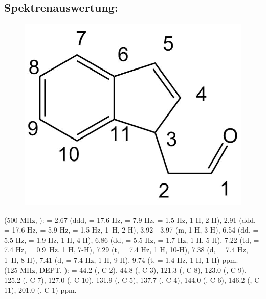 \documentclass[12pt]{article}
\begin{document}
\begin{onehalfspace}
\section{Spektrenauswertung:}
\begin{figure}[!htbp]
   \centering
\includegraphics[scale=0.3]{auswert.png}
\end{figure}
\noindent
\textbf{} (500 MHz, ): \sffamily \ce{$\delta$} =
2.67 (ddd,  = 17.6 \si{\hertz},  = 7.9 \si{\hertz},  = 1.5 \si{\hertz}, 1 H, 2-H),
2.91 (ddd,  = 17.6 \si{\hertz},  = 5.9 \si{\hertz},  = 1.5 \si{\hertz}, 1~H, 2-H), 
3.92 - 3.97 (m, 1 H, 3-H),
6.54 (dd,  = 5.5 \si{\hertz},  = 1.9 \si{\hertz}, 1 H, 4-H), 
6.86 (dd,  = 5.5 \si{\hertz},  = 1.7 \si{\hertz}, 1 H, 5-H), 
7.22 (td,  = 7.4 \si{\hertz},  = 0.9~\si{\hertz}, 1 H, 7-H),
7.29 (t,  = 7.4 \si{\hertz}, 1 H, 10-H),
7.38 (d,  = 7.4 \si{\hertz}, 1~H, 8-H),
7.41 (d,  = 7.4 \si{\hertz}, 1 H, 9-H),
9.74 (t,  = 1.4 \si{\hertz}, 1 H, 1-H) ppm. \\
\noindent
\textbf{} (125 MHz, DEPT, ): \sffamily \ce{$\delta$} =
44.2  (, C-2),
44.8  (, C-3),
121.3 (, C-8),
123.0 (, C-9),
125.2 (, C-7),
127.0 (, C-10), 
131.9 (, C-5), 
137.7 (, C-4),
144.0 (, C-6),
146.2 (, C-11),
201.0 (, C-1) ppm. 

\end{onehalfspace}
\end{document}

